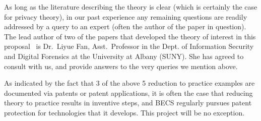 As long as the literature describing the theory is clear (which is certainly
the case for privacy theory), in our past experience any remaining questions
are readily addressed by a query to an expert (often the author of the
paper in question).
The lead author of two of the papers that developed the theory of interest
in this proposal~\cite{fx12,fx14}
is Dr.~Liyue Fan, Asst.~Professor in the Dept. of Information
Security and Digital Forensics at the University at Albany (SUNY).
She has agreed to consult with us, and provide answers to the very queries
we mention above.

As indicated by the fact that 3 of the above 5 reduction to practice
examples are documented
via patents or patent applications, it is often the case that reducing
theory to practice results in inventive steps, and BECS regularly pursues
patent protection for technologies that it develops.  This project will
be no exception.
